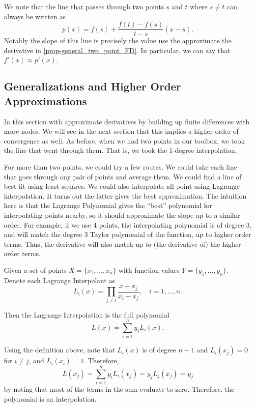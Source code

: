 \documentclass[11pt]{article}
\begin{document}
We note that the line that passes through two points $s$ and $t$ where $s \ne t$ can always be written as $$p(x) = f(s) + \frac{f(t)-f(s)}{t-s}(x-s).$$ Notably the slope of this line is precisely the value use the approximate the derivative in \cref{prop-general_two_point_FD}. In particular, we can say that $f'(x) \approx p'(x)$. 


\subsection{Generalizations and Higher Order Approximations}

In this section with approximate derivatives by building up finite differences with more nodes. We will see in the next section that this implies a higher order of convergence as well. As before, when we had two points in our toolbox, we took the line that went through them. That is, we took the 1-degree interpolation. 

For more than two points, we could try a few routes. We could take each line that goes through any pair of points and average them. We could find a line of best fit using least squares. We could also interpolate all point using Lagrange interpolation. It turns out the latter gives the best approximation. The intuition here is that the Lagrange Polynomial gives the ``best'' polynomial for interpolating points nearby, so it should approximate the slope up to a similar order. For example, if we use 4 points, the interpolating polynomial is of degree 3, and will match the degree 3 Taylor polynomial of the function, up to higher order terms. Thus, the derivative will also match up to (the derivative of) the higher order terms. 

\begin{definition}
    Given a set of points $X = \{x_1, ..., x_n\}$ with function values $Y = \{y_1, ..., y_n\}$. Denote each Lagrange Interpolant as $$L_i(x) = \prod_{j \ne i} \frac{x-x_j}{x_i-x_j}, \quad i = 1, ..., n.$$
  
    Then the Lagrange Interpolation is the full polynomial $$L(x) = \sum_{i=1}^n y_i L_i(x).$$
\end{definition}

\begin{remark}
    Using the definition above, note that $L_i(x)$ is of degree $n-1$ and $L_i(x_j) = 0$ for $i \ne j$, and $L_i(x_i) = 1$. Therefore, $$L(x_j) = \sum_{i=1}^n y_i L_i(x_j) = y_jL_j(x_j) = y_j$$ by noting that most of the terms in the sum evaluate to zero. Therefore, the polynomial is an interpolation.
\end{remark}
\end{document}
